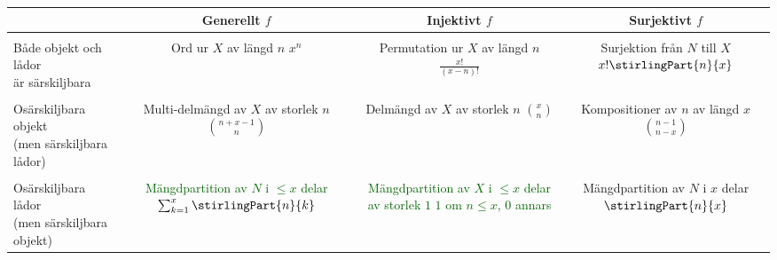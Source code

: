 \documentclass[nobib]{tufte-handout}
\begin{document}
\begin{fullwidth}
  \begin{tabularx}{\linewidth}{l|ccc}
      & Generellt $f$ & Injektivt $f$ & Surjektivt $f$\\
      \midrule
      
    &  &  & \\
    
       \specialcell{Både objekt och lådor\\ är särskiljbara} & \specialcell{Ord ur $X$ av längd $n$\\ $x^n$} & \specialcell{Permutation ur $X$ \\ av längd $n$\\ $\frac{x!}{(x-n)!}$} & \specialcell{Surjektion från $N$ till $X$\\$x!\stirlingPart{n}{x}$} \\
    
    &  &  & \\
    
    \specialcell{Osärskiljbara objekt \\ (men särskiljbara lådor)}  & \specialcell{Multi-delmängd av $X$\\ av storlek $n$\\$\binom{n + x - 1}{n}$} & \specialcell{Delmängd av $X$ \\ av storlek $n$\\$\binom{x}{n}$} & \specialcell{Kompositioner av $n$\\av längd $x$\\$\binom{n - 1}{n - x}$} \\
    
    &  &  & \\
    
       \specialcell{Osärskiljbara lådor\\ (men särskiljbara objekt)} & \specialcell{\textcolor{darkgreen}{Mängdpartition av $N$}\\ \textcolor{darkgreen}{ i $\leq x$ delar} \\\textcolor{darkgreen}{$\sum_{k=1}^{x} \stirlingPart{n}{k}$}} & \specialcell{\textcolor{darkgreen}{Mängdpartition av $X$}\\ \textcolor{darkgreen}{i $\leq x$ delar av storlek $1$}\\\textcolor{darkgreen}{$1$ om $n \leq x$, $0$ annars}} & \specialcell{Mängdpartition \\ av $N$ i $x$ delar\\$\stirlingPart{n}{x}$} \\
   

\end{tabularx}
\end{fullwidth}
\end{document}
